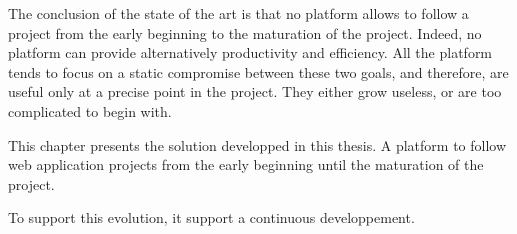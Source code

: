 


The conclusion of the state of the art is that no platform allows to follow a project from the early beginning to the maturation of the project.
Indeed, no platform can provide alternatively productivity and efficiency.
All the platform tends to focus on a static compromise between these two goals, and therefore, are useful only at a precise point in the project.
They either grow useless, or are too complicated to begin with.

This chapter presents the solution developped in this thesis.
A platform to follow web application projects from the early beginning until the maturation of the project.

To support this evolution, it support a continuous developpement.


% 